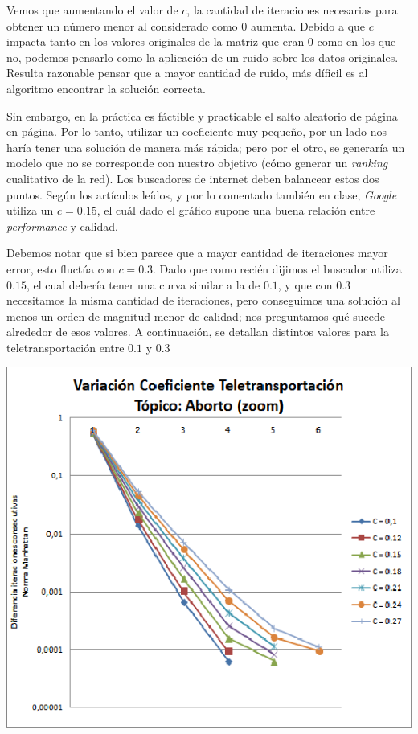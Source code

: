 	Vemos que aumentando el valor de $c$, la cantidad de iteraciones necesarias para obtener un número menor al considerado como $0$ aumenta. Debido a que $c$ impacta tanto en los valores originales de la matriz que eran $0$ como en los que no, podemos pensarlo como la aplicación de un ruido sobre los datos originales. Resulta razonable pensar que a mayor cantidad de ruido, más díficil es al algoritmo encontrar la solución correcta.

	Sin embargo, en la práctica es fáctible y practicable el salto aleatorio de página en página. Por lo tanto, utilizar un coeficiente muy pequeño, por un lado nos haría tener una solución de manera más rápida; pero por el otro, se generaría un modelo que no se corresponde con nuestro objetivo (cómo generar un \textit{ranking} cualitativo de la red). Los buscadores de internet deben balancear estos dos puntos. Según los artículos leídos, y por lo comentado también en clase, \textit{Google} utiliza un $c = 0.15$, el cuál dado el gráfico supone una buena relación entre \textit{performance} y calidad. 

	Debemos notar que si bien parece que a mayor cantidad de iteraciones mayor error, esto fluctúa con $c = 0.3$. Dado que como recién dijimos el buscador utiliza $0.15$, el cual debería tener una curva similar a la de $0.1$, y que con $0.3$ necesitamos la misma cantidad de iteraciones, pero conseguimos una solución al menos un orden de magnitud menor de calidad; nos preguntamos qué sucede alrededor de esos valores. A continuación, se detallan distintos valores para la teletransportación entre $0.1$ y $0.3$

	\par 
	\begin{center}
		\includegraphics[scale=0.6]{./img/page_rank_variacion_coef_teletransportacion_zoom.png}
	\end{center}
	\par 

